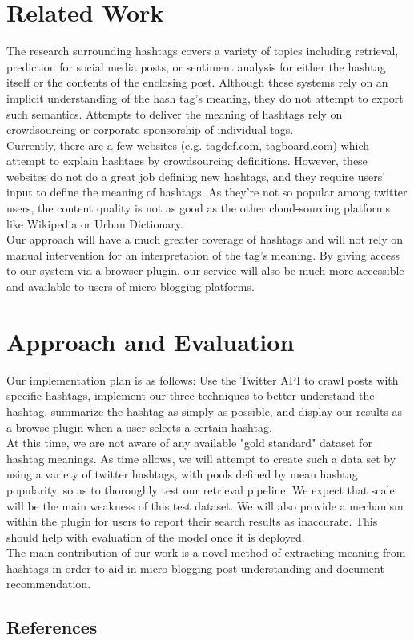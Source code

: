 \documentclass{sig-alternate}
\begin{document}
\section{Related Work}
The research surrounding hashtags covers a variety of topics including retrieval\cite{efron:retrieval}, prediction\cite{khabiri:predict}\cite{tagspace} for social media posts, or sentiment analysis for either the hashtag itself or the contents of the enclosing post.  Although these systems rely on an implicit understanding of the hash tag's meaning, they do not attempt to export such semantics.  Attempts to deliver the meaning of hashtags rely on crowdsourcing or corporate sponsorship of individual tags.\\
Currently, there are a few websites (e.g. tagdef.com, tagboard.com) which attempt to explain hashtags by crowdsourcing definitions. However, these websites do not do a great job defining new hashtags, and they require users’ input to define the meaning of hashtags. As they’re not so popular among twitter users, the content quality is not as good as the other cloud-sourcing platforms like Wikipedia or Urban Dictionary.\\
Our approach will have a much greater coverage of hashtags and will not rely on manual intervention for an interpretation of the tag's meaning.  By giving access to our system via a browser plugin, our service will also be much more accessible and available to users of micro-blogging platforms.\\

\section{Approach and Evaluation}
Our implementation plan is as follows: Use the Twitter API to crawl posts with specific hashtags, implement our three techniques to better understand the hashtag, summarize the hashtag as simply as possible, and display our results as a browse plugin when a user selects a certain hashtag.\\
  At this time, we are not aware of any available "gold standard" dataset for hashtag meanings.  As time allows, we will attempt to create such a data set by using a variety of twitter hashtags, with pools defined by mean hashtag popularity, so as to thoroughly test our retrieval pipeline.  We expect that scale will be the main weakness of this test dataset.  We will also provide a mechanism within the plugin for users to report their search results as inaccurate.  This should help with evaluation of the model once it is deployed.\\
The main contribution of our work is a novel method of extracting meaning from hashtags in order to aid in micro-blogging post understanding and document recommendation.\\

\subsection{References}


\end{document}
